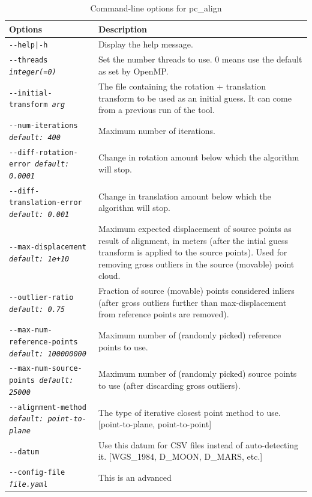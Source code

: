\begin{longtable}{|l|p{10cm}|}
\caption{Command-line options for pc\_align}
\label{tbl:pcalign}
\endfirsthead
\endhead
\endfoot
\endlastfoot
\hline
Options & Description \\ \hline \hline
\texttt{-\/-help|-h} & Display the help message.\\ \hline
\texttt{-\/-threads \textit{integer(=0)}} & Set the number threads to
use. 0 means use the default as set by OpenMP. \\ \hline
\texttt{-\/-initial-transform \textit{arg}} &
The file containing the rotation + translation transform to be used as an
initial guess. It can come from a previous run of the tool. \\ \hline
\texttt{-\/-num-iterations \textit{default: 400}} &  Maximum number of iterations. \\ \hline
\texttt{-\/-diff-rotation-error \textit{default: 0.0001}} & Change in rotation amount below which the algorithm will stop. \\ \hline
\texttt{-\/-diff-translation-error \textit{default: 0.001}} & Change in translation amount below which the algorithm will stop. \\ \hline
\texttt{-\/-max-displacement \textit{default: 1e+10}} & Maximum expected
displacement of source points as result of alignment, in meters (after
the intial guess transform is applied to the source points). Used
for removing gross outliers in the source (movable) point cloud.\\ \hline
\texttt{-\/-outlier-ratio \textit{default: 0.75}} &  Fraction of source (movable) points considered inliers (after gross outliers further than max-displacement from reference points are removed). \\ \hline
\texttt{-\/-max-num-reference-points \textit{default: 100000000}} &
Maximum number of (randomly picked) reference points to use. \\ \hline
\texttt{-\/-max-num-source-points \textit{default: 25000}} & Maximum number of (randomly picked) source points to use (after discarding gross outliers). \\ \hline
\texttt{-\/-alignment-method \textit{default: point-to-plane}} & The type of iterative closest point
method to use. [point-to-plane, point-to-point]\\ \hline
\texttt{-\/-datum \textit{}} & Use this datum for CSV files instead of
auto-detecting it. [WGS\_1984, D\_MOON, D\_MARS, etc.] \\ \hline
\texttt{-\/-config-file \textit{file.yaml}} & This is an advanced

\end{longtable}
